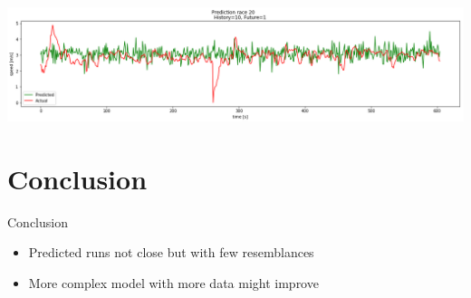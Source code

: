 \documentclass[aspectratio=169]{beamer}
\begin{document}

\begin{frame}
  \begin{center}
    \includegraphics[width=\textwidth]{02_plot_feat_time_speed_slope_slopeNext.png}
  \end{center}
\end{frame}

\section{Conclusion}

\begin{frame}{Conclusion}
    \begin{itemize}
        \item Predicted runs not close but with few resemblances
        \item More complex model with more data might improve
    \end{itemize}
\end{frame}

\end{document}

